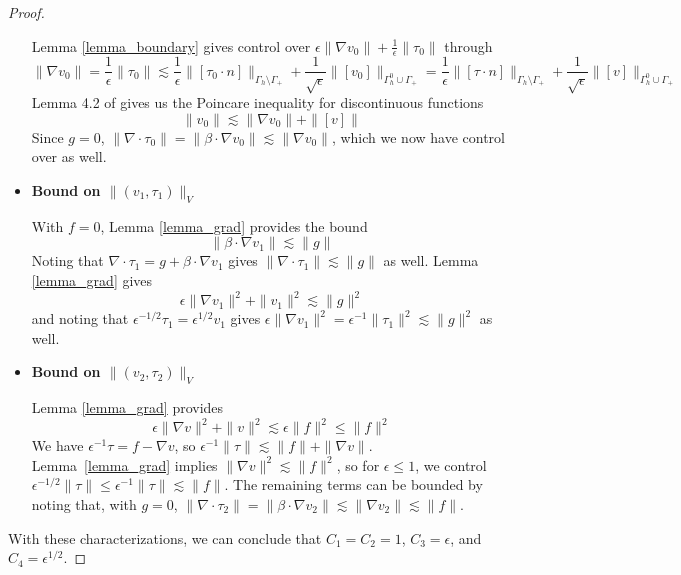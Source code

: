 \documentclass[11pt,onecolumn]{scrartcl}
\newcommand{\grad}{\nabla}
\renewcommand{\div}{\grad \cdot}
\begin{document}
\begin{proof}
\begin{itemize}
Lemma \ref{lemma_boundary} gives control over $\epsilon\|\grad v_0\| + \frac{1}{\epsilon}\|\tau_0\|$ through
\[
\|\grad v_0\| = \frac{1}{\epsilon}\|\tau_0\| \lesssim \frac{1}{\epsilon} \| [\tau_0\cdot n]\|_{\Gamma_h \setminus \Gamma_+} + \frac{1}{\sqrt{\epsilon}} \| [v_0]\|_{\Gamma_h^0 \cup \Gamma_+} = \frac{1}{\epsilon} \| [\tau\cdot n]\|_{\Gamma_h \setminus \Gamma_+} + \frac{1}{\sqrt{\epsilon}} \| [v]\|_{\Gamma_h^0 \cup \Gamma_+}
\]
Lemma 4.2 of \cite{analysisDPG} gives us the Poincare inequality for discontinuous functions
\[
\|v_0\| \lesssim \|\grad v_0\| + \|[v]\|
\]
Since $g = 0$, $\| \div \tau_0\| = \|\beta\cdot \grad v_0\|\lesssim \|\grad v_0\|$, which we now have control over as well.  

\item \textbf{Bound on $\|\left(v_{1},\tau_{1}\right)\|_V$}

With $f = 0$, Lemma \ref{lemma_grad} provides the bound
\[
\|\beta \cdot \grad v_1 \| \lesssim \| g\|
\]
Noting that $\div \tau_1 = g+\beta\cdot \grad v_1$ gives $\|\div \tau_1 \| \lesssim \|g\|$ as well.  Lemma \ref{lemma_grad} gives
\[
\epsilon \|\grad v_1\|^2 + \|v_1\|^2 \lesssim \|g\|^2
\]
and noting that $\epsilon^{-1/2}\tau_1 = \epsilon^{1/2}v_1$ gives $\epsilon\|\grad v_1\|^2 = \epsilon^{-1}\|\tau_1\|^2 \lesssim \|g\|^2$ as well.

\item \textbf{Bound on $\|\left(v_{2},\tau_{2}\right)\|_V$}

Lemma \ref{lemma_grad} provides
\[
\epsilon \|\grad v\|^2 + \|v\|^2 \lesssim  \epsilon \| f\|^2 \leq \|f\|^2
\]
We have $\epsilon^{-1}\tau = f - \grad v$, so $\epsilon^{-1} \|\tau\| \lesssim \|f\| + \|\grad v\|$. Lemma~\ref{lemma_grad} implies $\|\grad v\|^2  \lesssim  \| f\|^2$, so for $\epsilon \leq 1$, we control $\epsilon^{-1/2}\|\tau\| \leq \epsilon^{-1}\|\tau\| \lesssim \|f\|$.  The remaining terms can be bounded by noting that, with $g = 0$, $\|\div \tau_2\| = \|\beta\cdot \grad v_2\| \lesssim \|\grad v_2\| \lesssim \|f\| $.
\end{itemize}

With these characterizations, we can conclude that $C_1 = C_2 = 1$, $C_3 = \epsilon$, and $C_4 = \epsilon^{1/2}$.  
\end{proof}
\end{document}
